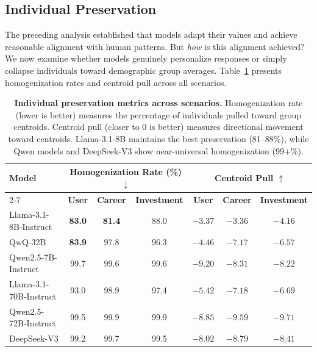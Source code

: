 \documentclass[final]{clv2025}
\begin{document}
\subsection{Individual Preservation}
\label{sec:individual_preservation_analysis}

The preceding analysis established that models adapt their values and achieve reasonable alignment with human patterns. But \textit{how} is this alignment achieved? We now examine whether models genuinely personalize responses or simply collapse individuals toward demographic group averages. Table~\ref{tab:preservation_cross_format} presents homogenization rates and centroid pull across all scenarios.

\begin{table}[H]
\centering
\small
\begin{tabular}{l|ccc|ccc}
    \toprule
    \multirow{2}{*}{\textbf{Model}}
    & \multicolumn{3}{c|}{\textbf{Homogenization Rate (\%) $\downarrow$}}
    & \multicolumn{3}{c}{\textbf{Centroid Pull $\uparrow$}} \\
    \cmidrule{2-7}
    & \textbf{User} & \textbf{Career} & \textbf{Investment}
    & \textbf{User} & \textbf{Career} & \textbf{Investment} \\
    \midrule
    Llama-3.1-8B-Instruct  & \textbf{83.0} & \textbf{81.4} & 88.0 & $-3.37$ & $-3.36$ & $-4.16$ \\
    QwQ-32B               & \textbf{83.9} & 97.8 & 96.3 & $-4.46$ & $-7.17$ & $-6.57$ \\
    Qwen2.5-7B-Instruct   & 99.7 & 99.6 & 99.6 & $-9.20$ & $-8.31$ & $-8.22$ \\
    Llama-3.1-70B-Instruct & 93.0 & 98.9 & 97.4 & $-5.42$ & $-7.18$ & $-6.69$ \\
    Qwen2.5-72B-Instruct  & 99.5 & 99.9 & 99.9 & $-8.85$ & $-9.59$ & $-9.71$ \\
    DeepSeek-V3           & 99.2 & 99.7 & 99.5 & $-8.02$ & $-8.79$ & $-8.41$ \\
    \bottomrule
\end{tabular}
\caption{
\textbf{Individual preservation metrics across scenarios.}
Homogenization rate (lower is better) measures the percentage of individuals pulled toward group centroids. Centroid pull (closer to 0 is better) measures directional movement toward centroids. Llama-3.1-8B maintains the best preservation (81--88\%), while Qwen models and DeepSeek-V3 show near-universal homogenization (99+\%).
}
\label{tab:preservation_cross_format}
\end{table}
\end{document}
